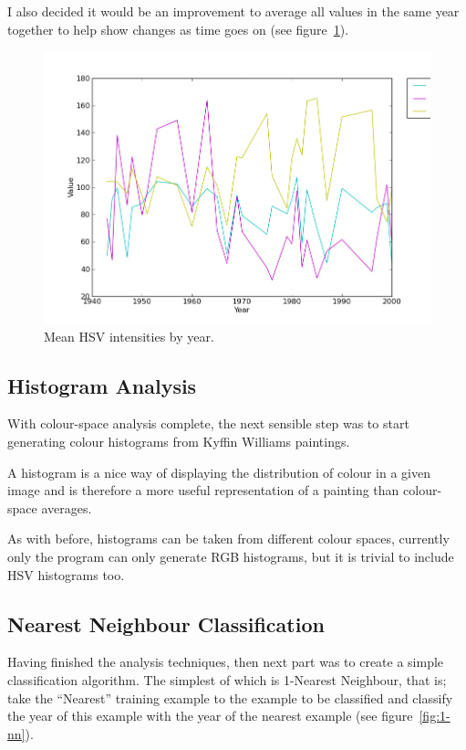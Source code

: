 \documentclass[11pt,fleqn,twoside]{article}
\begin{document}
I also decided it would be an improvement to average all values in the same year together to help
show changes as time goes on (see figure~\ref{fig:mean-hsv-by-year}).

\begin{figure}[p]
\includegraphics[scale=0.5]{img/hsv-legend-12-11-01.png}
\caption{Mean HSV intensities by year.}
\label{fig:mean-hsv-by-year}
\end{figure}


\subsection{Histogram Analysis}
With colour-space analysis complete, the next sensible step was to start generating colour 
histograms from Kyffin Williams paintings.

A histogram is a nice way of displaying the distribution of colour in a given image and is 
therefore a more useful representation of a painting than colour-space averages.

As with before, histograms can be taken from different colour spaces, currently only the program
can only generate RGB histograms, but it is trivial to include HSV histograms too.

\subsection{Nearest Neighbour Classification}
Having finished the analysis techniques, then next part was to create a simple classification 
algorithm. The simplest of which is 1-Nearest Neighbour, that is; take the ``Nearest'' training
example to the example to be classified and classify the year of this example with the year of the
nearest example (see figure~\ref{fig:1-nn}).
\end{document}
